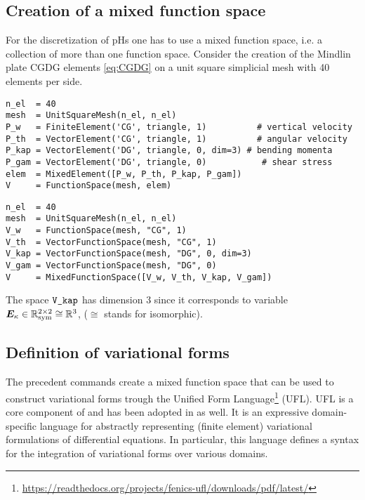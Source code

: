 \subsection*{Creation of a mixed function space}
For the discretization of pHs one has to use a mixed function space, i.e. a collection of more than one function space. Consider the creation of the Mindlin plate CGDG elements \eqref{eq:CGDG} on a unit square simplicial mesh with 40 elements per side.
\begin{tcolorbox}[title = Mixed function space in  \fenics, coltitle=black, breakable, size=fbox, boxrule=1pt, pad at break*=1mm, colframe=red, enlarge top by=0.25em, enlarge bottom by=0.5em]
\begin{Verbatim}[tabsize=4]
n_el  = 40
mesh  = UnitSquareMesh(n_el, n_el)
P_w   = FiniteElement('CG', triangle, 1)     	  # vertical velocity
P_th  = VectorElement('CG', triangle, 1)     	  # angular velocity
P_kap = VectorElement('DG', triangle, 0, dim=3)	# bending momenta			
P_gam = VectorElement('DG', triangle, 0)	       # shear stress 
elem  = MixedElement([P_w, P_th, P_kap, P_gam])
V     = FunctionSpace(mesh, elem)
\end{Verbatim}
\end{tcolorbox}
\begin{tcolorbox}[title = Mixed function space in  \firedrake, coltitle=black, breakable, size=fbox, boxrule=1pt, pad at break*=1mm, colframe=cyan, enlarge top by=0.25em, enlarge bottom by=0.5em]
\begin{Verbatim}[tabsize=4]
n_el  = 40
mesh  = UnitSquareMesh(n_el, n_el)
V_w   = FunctionSpace(mesh, "CG", 1)
V_th  = VectorFunctionSpace(mesh, "CG", 1)
V_kap = VectorFunctionSpace(mesh, "DG", 0, dim=3)
V_gam = VectorFunctionSpace(mesh, "DG", 0)
V     = MixedFunctionSpace([V_w, V_th, V_kap, V_gam])
\end{Verbatim}
\end{tcolorbox}
The space $\verb|V_kap|$ has dimension 3 since it corresponds to variable $\bm{E}_\kappa \in \mathbb{R}^{2\times 2}_{\text{sym}} \cong  \mathbb{R}^3$, ($\cong$ stands for isomorphic).

\subsection*{Definition of variational forms}
The precedent commands create a mixed function space that can be used to construct variational forms trough the Unified Form Language\footnote{\url{https://readthedocs.org/projects/fenics-ufl/downloads/pdf/latest/}} \cite{alnaes2014} (UFL). UFL is a core component of \fenics and has been adopted in \firedrake as well. It is an expressive domain-specific language for abstractly representing (finite element) variational formulations of differential equations. In particular, this language defines a syntax for the integration of variational forms over various domains. \\


